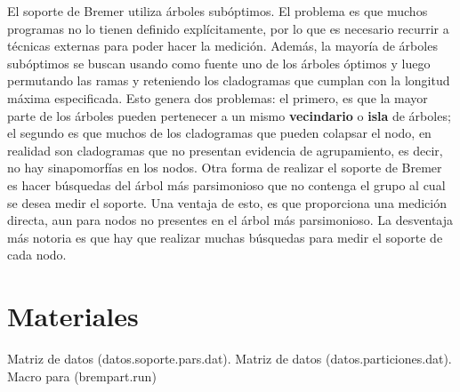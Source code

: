 El soporte de Bremer utiliza \'arboles sub\'optimos. El problema es que muchos programas no lo tienen definido expl\'icitamente, por lo que es necesario recurrir a t\'ecnicas externas para poder hacer la medici\'on. Adem\'as, la mayor\'ia de \'arboles sub\'optimos se buscan usando como fuente uno de los \'arboles \'optimos y luego permutando las ramas y reteniendo los cladogramas que cumplan con la longitud m\'axima especificada. Esto genera dos problemas: el primero, es que la mayor parte de los \'arboles pueden pertenecer a un mismo \textbf{vecindario} o \textbf{isla} de \'arboles; el segundo es que muchos de los cladogramas que pueden colapsar el nodo, en realidad son cladogramas que no presentan evidencia de agrupamiento, es decir, no hay sinapomorf\'ias en los nodos. Otra forma de realizar el soporte de Bremer es hacer b\'usquedas del \'arbol m\'as parsimonioso que no contenga el grupo al cual se desea medir el soporte. Una ventaja de esto, es que proporciona una medici\'on directa, aun para nodos no presentes en el \'arbol m\'as parsimonioso. La desventaja m\'as notoria es que hay que realizar muchas b\'usquedas para medir el soporte de cada nodo.
\section{Materiales}
\noindent
Matriz de datos (datos.soporte.pars.dat).
Matriz de datos (datos.particiones.dat).
Macro para  (brempart.run)
